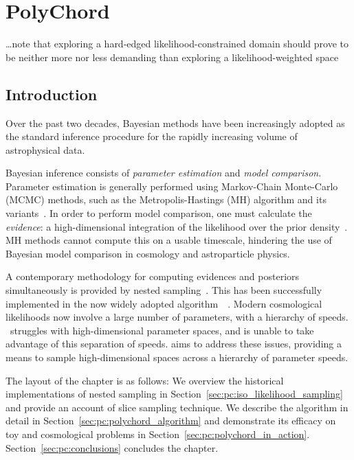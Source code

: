 \chapter{PolyChord}
\label{chap:pc}

\epigraph{\ldots note that exploring a hard-edged likelihood-constrained domain should prove to be neither more nor less demanding than exploring a likelihood-weighted space }{\johnskilling{}}

\section{Introduction}
\label{sec:pc:introduction}
Over the past two decades, Bayesian methods have been increasingly adopted as the standard inference procedure for the rapidly increasing volume of astrophysical data.

Bayesian inference consists of {\em parameter estimation\/} and {\em model comparison}.  Parameter estimation is generally performed using Markov-Chain Monte-Carlo (MCMC) methods, such as the Metropolis-Hastings (MH) algorithm and its variants~\citep{Mackay}.  In order to perform model comparison, one must calculate the {\em evidence\/}: a high-dimensional integration of the likelihood over the prior density~\citep{Sivia}.  MH methods cannot compute this on a usable timescale, hindering the use of Bayesian model comparison in cosmology and astroparticle physics.

A contemporary methodology for computing evidences and posteriors simultaneously is provided by nested sampling~\citep{skilling2006}. This has been successfully implemented in the now widely adopted algorithm \MultiNest\,~\citep{MultiNest1,MultiNest2,MultiNest3}.  Modern cosmological likelihoods now involve a large number of parameters, with a hierarchy of speeds.  \MultiNest\ struggles with high-dimensional parameter spaces, and is unable to take advantage of this separation of speeds.  \PolyChord{} aims to address these issues, providing a means to sample high-dimensional spaces across a hierarchy of parameter speeds.

The layout of the chapter is as follows:
We overview the historical implementations of nested sampling in Section~\ref{sec:pc:iso_likelihood_sampling} and provide an account of  slice sampling technique.
We describe the \PolyChord{} algorithm in detail in Section~\ref{sec:pc:polychord_algorithm} and demonstrate its efficacy on toy and cosmological problems in Section~\ref{sec:pc:polychord_in_action}.  
Section~\ref{sec:pc:conclusions} concludes the chapter.

